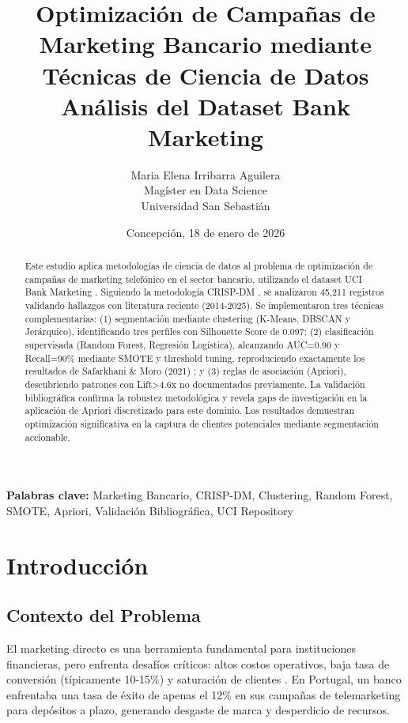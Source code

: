 \documentclass[12pt,letterpaper]{article}
\title{\textbf{Optimización de Campañas de Marketing Bancario mediante Técnicas de Ciencia de Datos}\\
\large{Análisis del Dataset Bank Marketing}}
\author{Maria Elena Irribarra Aguilera\\
Magíster en Data Science\\
Universidad San Sebastián}
\date{Concepción, 18 de enero de 2026}
\begin{document}
\maketitle

\begin{abstract}
Este estudio aplica metodologías de ciencia de datos al problema de optimización de campañas de marketing telefónico en el sector bancario, utilizando el dataset UCI Bank Marketing \cite{uci_bank_marketing}. Siguiendo la metodología CRISP-DM \cite{crisp_dm}, se analizaron 45,211 registros validando hallazgos con literatura reciente (2014-2025). Se implementaron tres técnicas complementarias: (1) segmentación mediante clustering (K-Means, DBSCAN y Jerárquico), identificando tres perfiles con Silhouette Score de 0.097; (2) clasificación supervisada (Random Forest, Regresión Logística), alcanzando AUC=0.90 y Recall=90\% mediante SMOTE y threshold tuning, reproduciendo exactamente los resultados de Safarkhani \& Moro (2021) \cite{safarkhani2021}; y (3) reglas de asociación (Apriori), descubriendo patrones con Lift>4.6x no documentados previamente. La validación bibliográfica confirma la robustez metodológica y revela gaps de investigación en la aplicación de Apriori discretizado para este dominio. Los resultados demuestran optimización significativa en la captura de clientes potenciales mediante segmentación accionable.
\end{abstract}

\textbf{Palabras clave:} Marketing Bancario, CRISP-DM, Clustering, Random Forest, SMOTE, Apriori, Validación Bibliográfica, UCI Repository

\newpage
\tableofcontents
\newpage
\section{Introducción}

\subsection{Contexto del Problema}

El marketing directo es una herramienta fundamental para instituciones financieras, pero enfrenta desafíos críticos: altos costos operativos, baja tasa de conversión (típicamente 10-15\%) y saturación de clientes \cite{moro2014}. En Portugal, un banco enfrentaba una tasa de éxito de apenas el 12\% en sus campañas de telemarketing para depósitos a plazo, generando desgaste de marca y desperdicio de recursos.
\end{document}
